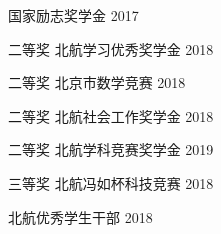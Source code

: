 



\begin{cvhonors}

    \cvhonor
        {国家励志奖学金} %
        {} %
        {} %
        {2017} %

    \cvhonor
        {二等奖}
        {北航学习优秀奖学金}
        {}
        {2018}
        
    \cvhonor
        {二等奖}
        {北京市数学竞赛}
        {}
        {2018}

    \cvhonor
        {二等奖}
        {北航社会工作奖学金}
        {}
        {2018}

    \cvhonor
        {二等奖}
        {北航学科竞赛奖学金}
        {}
        {2019}

    \cvhonor
        {三等奖}
        {北航冯如杯科技竞赛}
        {}
        {2018}

    \cvhonor
        {北航优秀学生干部}
        {}
        {}
        {2018}

\end{cvhonors}

